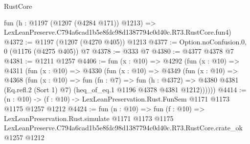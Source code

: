 \begin{lexlean}{RustCore}
\begin{coremodule}
    fun (h : @1197 (@1207 (@4284 @171)) @1213) =>
    LexLeanPreserve.C794a6cad1b5e8fdc98d1387794c0d40c.R73.RustCore.fun4)
@4372 := @1197 (@1207 (@4270 @405)) @1213
@4377 := Option.noConfusion.{0, 0} (@1176 (@4275 @405)) @7
@4378 := @333 @7
@4380 := @4377 @4378 @7
@4381 := @1211 @1257
@4406 := fun (x : @10) =>
  @4292
    (fun (x : @10) =>
    @4311
      (fun (x : @10) =>
      @4330
        (fun (x : @10) =>
        @4349
          (fun (x : @10) =>
          @4368
            (fun (x : @10) =>
            fun (fn : @7) =>
            fun (h : @4372) =>
            @4380 @4381 (Eq.refl.{2} (Sort 1) @7) (heq_of_eq.{1} @1196 @4378 @4381 @1212))))))
@4414 := (n : @10) -> (f : @10) -> LexLeanPreservation.Rust.FunSem @1171 @1173 @1175 @1257 @1212
@4424 := fun (n : @10) =>
  fun (f : @10) =>
  LexLeanPreservation.Rust.simulate
    @1171
    @1173
    @1175
    LexLeanPreserve.C794a6cad1b5e8fdc98d1387794c0d40c.R73.RustCore.crate_ok
    @1257
    @1212
\end{coremodule}
\end{lexlean}
